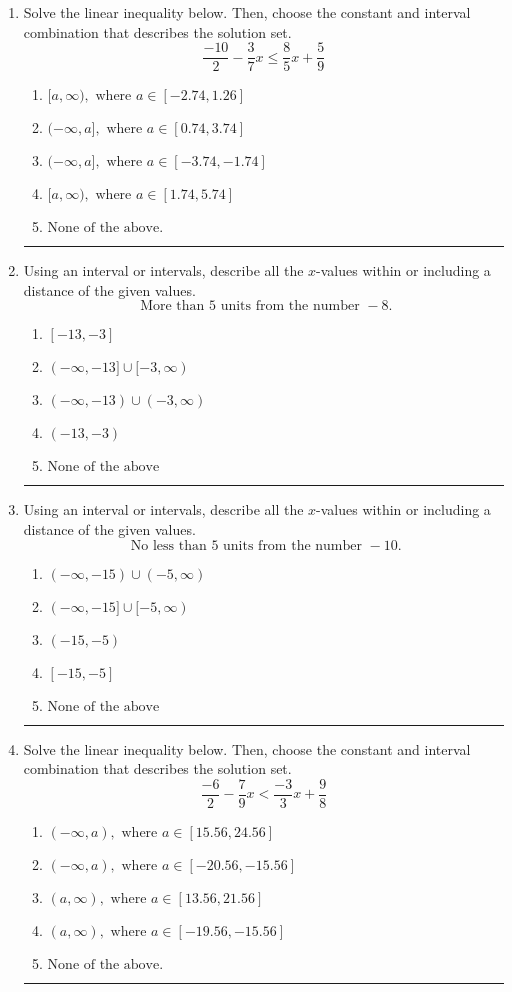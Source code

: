\documentclass[14pt]{extbook}
\newcommand{\litem}[1]{\item#1\hspace*{-1cm}\rule{\textwidth}{0.4pt}}
\begin{document}
\begin{enumerate}
\litem{
Solve the linear inequality below. Then, choose the constant and interval combination that describes the solution set.\[ \frac{-10}{2} - \frac{3}{7} x \leq \frac{8}{5} x + \frac{5}{9} \]\begin{enumerate}[label=\Alph*.]
\item \( [a, \infty), \text{ where } a \in [-2.74, 1.26] \)
\item \( (-\infty, a], \text{ where } a \in [0.74, 3.74] \)
\item \( (-\infty, a], \text{ where } a \in [-3.74, -1.74] \)
\item \( [a, \infty), \text{ where } a \in [1.74, 5.74] \)
\item \( \text{None of the above}. \)

\end{enumerate} }
\litem{
Using an interval or intervals, describe all the $x$-values within or including a distance of the given values.\[ \text{ More than } 5 \text{ units from the number } -8. \]\begin{enumerate}[label=\Alph*.]
\item \( [-13, -3] \)
\item \( (-\infty, -13] \cup [-3, \infty) \)
\item \( (-\infty, -13) \cup (-3, \infty) \)
\item \( (-13, -3) \)
\item \( \text{None of the above} \)

\end{enumerate} }
\litem{
Using an interval or intervals, describe all the $x$-values within or including a distance of the given values.\[ \text{ No less than } 5 \text{ units from the number } -10. \]\begin{enumerate}[label=\Alph*.]
\item \( (-\infty, -15) \cup (-5, \infty) \)
\item \( (-\infty, -15] \cup [-5, \infty) \)
\item \( (-15, -5) \)
\item \( [-15, -5] \)
\item \( \text{None of the above} \)

\end{enumerate} }
\litem{
Solve the linear inequality below. Then, choose the constant and interval combination that describes the solution set.\[ \frac{-6}{2} - \frac{7}{9} x < \frac{-3}{3} x + \frac{9}{8} \]\begin{enumerate}[label=\Alph*.]
\item \( (-\infty, a), \text{ where } a \in [15.56, 24.56] \)
\item \( (-\infty, a), \text{ where } a \in [-20.56, -15.56] \)
\item \( (a, \infty), \text{ where } a \in [13.56, 21.56] \)
\item \( (a, \infty), \text{ where } a \in [-19.56, -15.56] \)
\item \( \text{None of the above}. \)


\end{enumerate}}
\end{enumerate}
\end{document}

